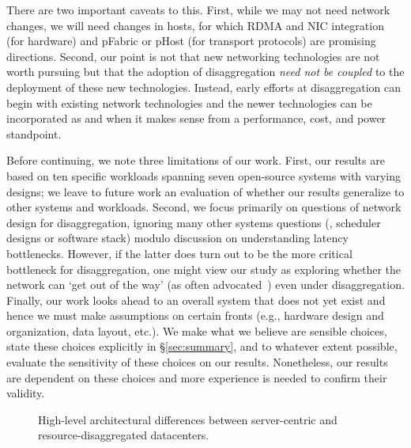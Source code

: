 There are two important caveats to this.  First, while we may not need network changes, we will need changes in hosts, for which RDMA and NIC integration (for hardware) and pFabric or pHost (for transport protocols) are promising directions. Second, our point is not that new networking technologies are not worth pursuing but that the adoption of disaggregation \emph{need not be coupled} to the deployment of these new technologies. Instead, early efforts at disaggregation can begin with existing network technologies and the newer technologies can be incorporated as and when it makes sense from a performance, cost, and power standpoint.

Before continuing, we note three limitations of our work. First, our results are based on ten specific workloads spanning seven open-source systems with varying designs; we leave to future work an evaluation of whether our results generalize to other systems and workloads.
Second, we focus primarily on questions of network design for disaggregation, ignoring many other systems questions (\eg, scheduler designs or software stack) modulo discussion on understanding latency bottlenecks. However, if the latter does turn out to be the more critical bottleneck for disaggregation, one might view our study as exploring whether the network can `get out of the way' (as often advocated~\cite{greenberg-sigcomm15}) even under disaggregation. Finally, our work looks ahead to an overall system that does not yet exist and hence we must make assumptions on certain fronts (e.g., hardware design and organization, data layout, etc.). We make what we believe are sensible choices, state these choices explicitly in \S\ref{sec:summary}, and to whatever extent possible, evaluate the sensitivity of these choices on our results. Nonetheless, our results are dependent on these choices and more experience is needed to confirm their validity.

\begin{figure}[!h]
\centering 
{}
{}
\caption{High-level architectural differences between server-centric and resource-disaggregated datacenters.}
\label{fig:dc}
\end{figure}
